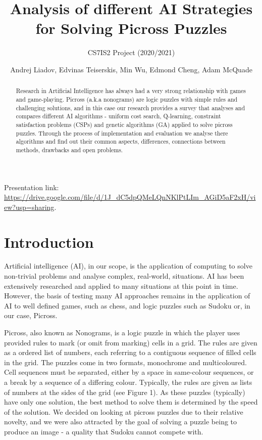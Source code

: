 \documentclass{svproc}
\begin{document}
\mainmatter
\title{Analysis of different AI Strategies for Solving Picross Puzzles}
\subtitle{CS7IS2 Project (2020/2021)}
\author{Andrej Liadov, Edvinas Teiserskis, Min Wu, Edmond Cheng, Adam McQuade}

\maketitle              %

{\small Presentation link: \url{https://drive.google.com/file/d/1J_dC5dpQMeLQnNKlPtLIm_AGiD5aF2xH/view?usp=sharing}.}

\begin{abstract}
Research in Artificial Intelligence has always had a very strong relationship with games and game-playing. Picross (a.k.a nonograms) are logic puzzles with simple rules and challenging solutions, and in this case our research provides a survey that analyses and compares different AI algorithms - uniform cost search, Q-learning, constraint satisfaction problems (CSPs) and genetic algorithms (GA) applied to solve picross puzzles. Through the process of implementation and evaluation we analyse there algorithms and find out their common aspects, differences, connections between methods, drawbacks and open problems.
\end{abstract}


\section{Introduction}
Artificial intelligence (AI), in our scope, is the application of computing to solve non-trivial problems and analyse complex, real-world, situations.
AI has been extensively researched and applied to many situations at this point in time. However, the basis of testing many AI approaches remains in the application of AI to well defined games, such as chess, and logic puzzles such as Sudoku or, in our case, Picross.

Picross, also known as Nonograms, is a logic puzzle in which the player uses provided rules to mark (or omit from marking) cells in a grid.
The rules are given as a ordered list of numbers, each referring to a contiguous sequence of filled cells in the grid.
The puzzles come in two formats, monochrome and multicoloured.
Cell sequences must be separated, either by a space in same-colour sequences, or a break by a sequence of a differing colour.
Typically, the rules are given as lists of numbers at the sides of the grid (see Figure 1). As these puzzles (typically) have only one solution, the best method to solve them is determined by the speed of the solution.
We decided on looking at picross puzzles due to their relative novelty, and we were also attracted by the goal of solving a puzzle being to produce an image - a quality that Sudoku cannot compete with.
\end{document}
